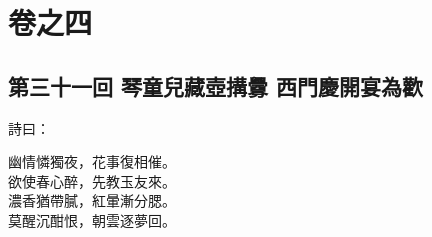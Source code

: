 \part*{{\titlename}卷之四}



\chapter*{第三十一回 琴童兒藏壺搆釁 西門慶開宴為歡}


詩曰：

\begin{myquote}
幽情憐獨夜，花事復相催。\\欲使春心醉，先教玉友來。\\濃香猶帶膩，紅暈漸分腮。\\莫醒沉酣恨，朝雲逐夢回。
\end{myquote}

